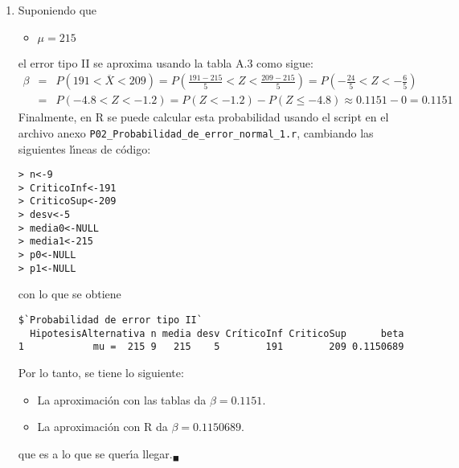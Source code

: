 \begin{solucion}
\begin{enumerate}
  \item Suponiendo que
  \begin{itemize}
   \item $\mu = 215$
  \end{itemize}
  el error tipo II se aproxima usando la tabla A.3 como sigue:
  \begin{eqnarray*}
   \beta & = & P\left(191 < \overline{X} < 209\right) = P\left(\frac{191 - 215}{5} < Z < \frac{209 - 215}{5}\right) = P\left( -\frac{24}{5} < Z < -\frac{6}{5} \right) \\
   & = & P( -4.8 < Z < -1.2 ) = P(Z < -1.2) - P(Z \leq -4.8) \approx 0.1151 - 0 = 0.1151
  \end{eqnarray*}
  Finalmente, en R se puede calcular esta probabilidad usando el script en el archivo anexo \texttt{P02\_Probabilidad\_de\_error\_normal\_1.r}, cambiando las siguientes l\'{\i}neas de c\'odigo:
  \begin{verbatim}
> n<-9
> CriticoInf<-191
> CriticoSup<-209
> desv<-5
> media0<-NULL
> media1<-215
> p0<-NULL
> p1<-NULL
  \end{verbatim}
  \vspace{-0.5cm}
  con lo que se obtiene
  \begin{verbatim}
$`Probabilidad de error tipo II`
  HipotesisAlternativa n media desv CríticoInf CriticoSup      beta
1            mu =  215 9   215    5        191        209 0.1150689
  \end{verbatim}
  \vspace{-0.5cm}
  Por lo tanto, se tiene lo siguiente:
  \begin{itemize}
   \item La aproximaci\'on con las tablas da $\beta = 0.1151$.
   \item La aproximaci\'on con R da $\beta = 0.1150689$.
  \end{itemize}
  que es a lo que se quer\'{\i}a llegar.${}_{\blacksquare}$
 \end{enumerate}
\end{solucion}
